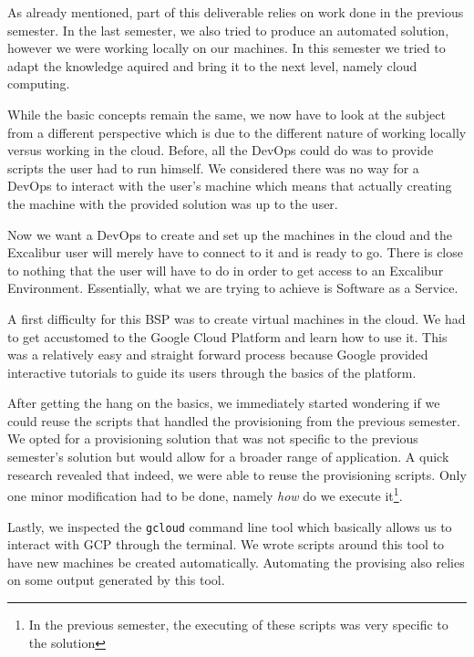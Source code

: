 As already mentioned, part of this deliverable relies on work done in
the previous semester. In the last semester, we also tried to produce
an automated solution, however we were working locally on our
machines. In this semester we tried to adapt the knowledge aquired and
bring it to the next level, namely cloud computing. 

While the basic concepts remain the same, we now have to look at the
subject from a different perspective which is due to the different
nature of working locally versus working in the cloud. Before, all the
DevOps could do was to provide scripts the user had to run himself.
We considered there was no way for a DevOps to interact with the
user's machine which means that actually creating the machine with the
provided solution was up to the user.

Now we want a DevOps to create and set up the machines in the cloud
and the Excalibur user will merely have to connect to it and is ready
to go. There is close to nothing that the user will have to do in
order to get access to an Excalibur Environment.  Essentially, what we
are trying to achieve is Software as a Service.

A first difficulty for this BSP was to create virtual machines in the
cloud. We had to get accustomed to the Google Cloud Platform and learn
how to use it. This was a relatively easy and straight forward process
because Google provided interactive tutorials to guide its users
through the basics of the platform.

After getting the hang on the basics, we immediately started wondering
if we could reuse the scripts that handled the provisioning from the
previous semester. We opted for a provisioning solution that was not
specific to the previous semester's solution but would allow for a
broader range of application.  A quick research revealed that indeed,
we were able to reuse the provisioning scripts. Only one minor
modification had to be done, namely \textit{how} do we execute
it\footnote{In the previous semester, the executing of these scripts
was very specific to the solution}.

Lastly, we inspected the \texttt{gcloud} command line tool which
basically allows us to interact with GCP through the terminal. We
wrote scripts around this tool to have new machines be created
automatically. Automating the provising also relies on some output
generated by this tool.
